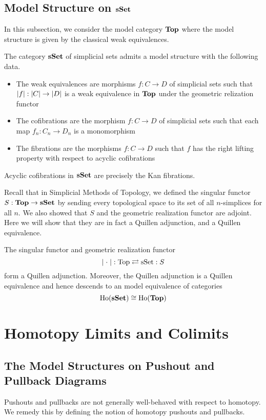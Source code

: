 \documentclass[a4paper]{article}
\begin{document}
\subsection{Model Structure on $\bold{sSet}$}
In this subsection, we consider the model category $\bold{Top}$ where the model structure is given by the classical weak equivalences. 

\begin{thm}{}{} The category $\bold{sSet}$ of simplicial sets admits a model structure with the following data. 
\begin{itemize}
\item The weak equivalences are morphisms $f:C\to D$ of simplicial sets such that $\abs{f}:\abs{C}\to\abs{D}$ is a weak equivalence in $\bold{Top}$ under the geometric relization functor
\item The cofibrations are the morphism $f:C\to D$ of simplicial sets such that each map $f_n:C_n\to D_n$ is a monomorphism
\item The fibrations are the morphisms $f:C\to D$ such that $f$ has the right lifting property with respect to acyclic cofibrations
\end{itemize}
\end{thm}

\begin{lmm}{}{} Acyclic cofibrations in $\bold{sSet}$ are precisely the Kan fibrations. 
\end{lmm}

Recall that in Simplicial Methods of Topology, we defined the singular functor $S:\bold{Top}\to\bold{sSet}$ by sending every topological space to its set of all $n$-simplices for all $n$. We also showed that $S$ and the geometric realization functor are adjoint. Here we will show that they are in fact a Quillen adjunction, and a Quillen equivalence. 

\begin{thm}{}{} The singular functor and geometric realization functor $$\abs{\;\cdot\;}:\text{Top}\rightleftarrows\text{sSet}:S$$ form a Quillen adjunction. Moreover, the Quillen adjunction is a Quillen equivalence and hence descends to an model equivalence of categories $$\text{Ho}(\bold{sSet})\cong\text{Ho}(\bold{Top})$$
\end{thm}

\pagebreak
\section{Homotopy Limits and Colimits}
\subsection{The Model Structures on Pushout and Pullback Diagrams}
Pushouts and pullbacks are not generally well-behaved with respect to homotopy. We remedy this by defining the notion of homotopy pushouts and pullbacks. 
\end{document}
